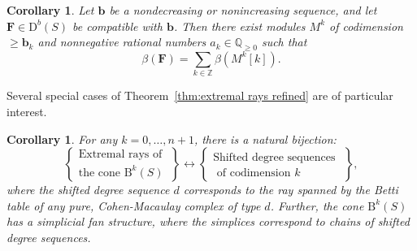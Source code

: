 \documentclass[12pt]{amsart}
\newtheorem{cor}[lemma]{Corollary}
\theoremstyle{definition}
\theoremstyle{remark}
\newcommand{\ZZ}{\mathbb{Z}}
\newcommand{\QQ}{\mathbb{Q}}
\newcommand{\bb}{\mathbf{b}}
\newcommand{\FF}{\mathbf{F}}
\newcommand{\DD}{\mathrm{D}}
\newcommand{\BBQ}{\mathrm{B}}
\begin{document}
% 
% 
%
%

\begin{cor}\label{cor:decompose refined}
Let $\bb$ be a nondecreasing or nonincreasing sequence, and let $\FF\in \DD^b(S)$ be compatible with $\bb$.  Then there exist modules $M^k$ of codimension $\geq \bb_k$ and nonnegative rational numbers $a_k\in \QQ_{\geq 0}$ such that
\[
\beta(\FF)=\sum_{k\in \ZZ} \beta(M^k[k]).
\]
\end{cor}

Several special cases of Theorem~\ref{thm:extremal rays refined} are of particular interest.

\begin{cor}\label{cor:uniform}
For any $k=0,\dots, n+1$, there is a natural bijection:
\[
\left\{
\begin{matrix}
\text{Extremal rays of }\\
\text{the cone } \BBQ^{k}(S)
\end{matrix}
\right\}
\longleftrightarrow
\left\{
\begin{matrix}
\text{Shifted degree sequences }\\
\text{ of codimension $k$}
\end{matrix}
\right\},
\]
where the shifted degree sequence $d$ corresponds to the ray spanned by the Betti table of any pure, Cohen-Macaulay complex of type $d$. Further, the cone $\BBQ^{k}(S)$ has a simplicial fan structure, where the simplices correspond to chains of shifted degree sequences.
\end{cor}
\end{document}
